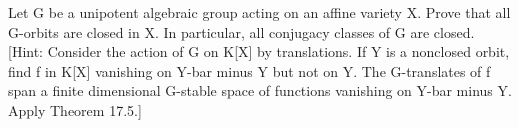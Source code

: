 Let G be a unipotent algebraic group acting on an affine variety X. Prove that all G-orbits are closed in X. In particular, all conjugacy classes of G are closed. [Hint: Consider the action of G on K[X] by translations. If Y is a nonclosed orbit, find f in K[X] vanishing on Y-bar minus Y but not on Y. The G-translates of f span a finite dimensional G-stable space of functions vanishing on Y-bar minus Y. Apply Theorem 17.5.]
